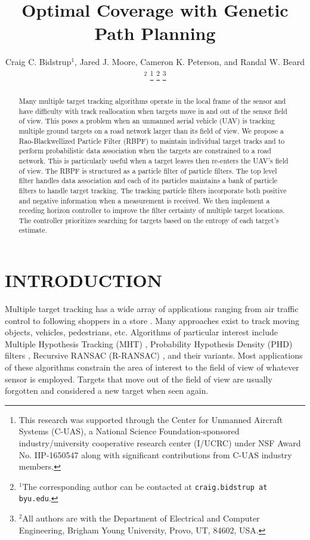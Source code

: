 \documentclass[letterpaper, 10 pt, conference]{ieeeconf}  %
\title{\LARGE \bf
Optimal Coverage with Genetic Path Planning
}
\author{Craig C. Bidstrup$^{1}$, Jared J. Moore, Cameron K. Peterson, and Randal W. Beard$^{2}$%
\thanks{This research was supported through the Center for Unmanned Aircraft Systems (C-UAS), a National Science Foundation-sponsored industry/university
cooperative research center (I/UCRC) under NSF Award No. IIP-1650547
along with significant contributions from C-UAS industry members.}%
\thanks{$^{1}$The corresponding author can be contacted at
        {\tt\small craig.bidstrup at byu.edu}.}%
\thanks{$^{2}$All authors are with the Department of Electrical and Computer Engineering,
        Brigham Young University, Provo, UT, 84602, USA.}%
}
\begin{document}
\maketitle
\thispagestyle{empty}
\pagestyle{empty}


\begin{abstract}

Many multiple target tracking algorithms operate in the local frame of the sensor and have difficulty with track reallocation when targets move in and out of the sensor field of view. This poses a problem when an unmanned aerial vehicle (UAV) is tracking multiple ground targets on a road network larger than its field of view. We propose a Rao-Blackwellized Particle Filter (RBPF) to maintain individual target tracks and to perform probabilistic data association when the targets are constrained to a road network. This is particularly useful when a target leaves then re-enters the UAV's field of view. The RBPF is structured as a particle filter of particle filters. The top level filter handles data association and each of its particles maintains a bank of particle filters to handle target tracking. The tracking particle filters incorporate both positive and negative information when a measurement is received. We then implement a receding horizon controller to improve the filter certainty of multiple target locations. The controller prioritizes searching for targets based on the entropy of each target's estimate.

\end{abstract}


\section{INTRODUCTION}

Multiple target tracking has a wide array of applications ranging from air traffic control \cite{Li1993} to following shoppers in a store \cite{Liu2007}. Many approaches exist to track moving objects, vehicles, pedestrians, etc. Algorithms of particular interest include Multiple Hypothesis Tracking (MHT) \cite{Reid1979}, Probability Hypothesis Density (PHD) filters \cite{Clark2007}, Recursive RANSAC (R-RANSAC) \cite{Niedfeldt2014}, and their variants. Most applications of these algorithms constrain the area of interest to the field of view of whatever sensor is employed. Targets that move out of the field of view are usually forgotten and considered a new target when seen again.
\end{document}
